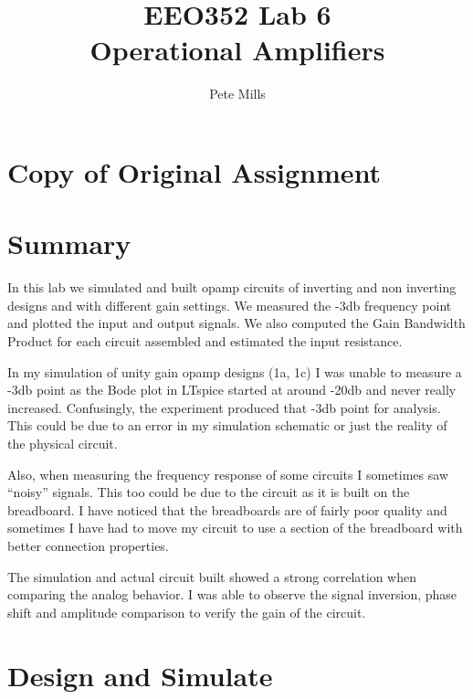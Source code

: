 \documentclass{article}
\begin{document}
	
	
	\title{EEO352 Lab 6\\Operational Amplifiers}
	\author{Pete Mills}
	
	\maketitle
	
	\section*{Copy of Original Assignment}
	
	
	
	
	\section*{Summary}
	
	In this lab we simulated and built opamp circuits of inverting and non inverting designs and with different gain settings. We measured the -3db frequency point and plotted the input and output signals. We also computed the Gain Bandwidth Product for each circuit assembled and estimated the input resistance.
	
	In my simulation of unity gain opamp designs (1a, 1c) I was unable to measure a -3db point as the Bode plot in LTspice started at around -20db and never really increased. Confusingly, the experiment produced that -3db point for analysis. This could be due to an error in my simulation schematic or just the reality of the physical circuit.
	
	Also, when measuring the frequency response of some circuits I sometimes saw ``noisy'' signals. This too could be due to the circuit as it is built on the breadboard. I have noticed that the breadboards are of fairly poor quality and sometimes I have had to move my circuit to use a section of the breadboard with better connection properties.
	
	The simulation and actual circuit built showed a strong correlation when comparing the analog behavior. I was able to observe the signal inversion, phase shift and amplitude comparison to verify the gain of the circuit.
	

	\section{Design and Simulate}
	
\end{document}
